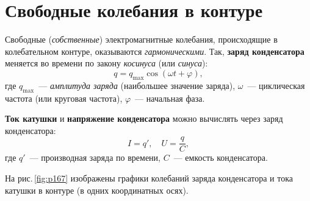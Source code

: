 \documentclass[main.tex]{subfiles}
\begin{document}

\pagestyle{empty}

 

\setcounter{section}{43
}
\addtocounter{section}{-1} 

\section{Свободные колебания в контуре}


Свободные (\emph{собственные}) электромагнитные колебания, происходящие в колебательном контуре, оказываются \emph{гармоническими}. Так, \textbf{заряд конденсатора} меняется во времени по закону \emph{косинуса} (или \emph{синуса}):
\begin{equation}
    q=q_\text{max}\cos(\omega t + \varphi),
\end{equation}
где $q_\text{max}$~--- \emph{амплитуда заряда} (наибольшее значение заряда), $\omega$~--- циклическая частота (или круговая частота),
$\varphi$~--- начальная фаза.

\textbf{Ток катушки} и \textbf{напряжение конденсатора} можно вычислять через заряд конденсатора:
\begin{equation}
    I=q',\quad U=\frac{q}{C},
\end{equation}
где $q'$~--- производная заряда по времени, $C$~--- емкость конденсатора.

На рис.\,\ref{fig:p167} изображены графики колебаний заряда конденсатора и тока катушки в контуре (в одних координатных осях).
\end{document}
